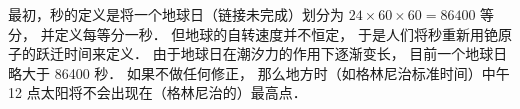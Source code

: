 
最初，秒的定义是将一个地球日（链接未完成）划分为 $24\times60\times60 = 86400$ 等分， 并定义每等分一秒． 但地球的自转速度并不恒定， 于是人们将秒重新用铯原子的跃迁时间来定义． 由于地球日在潮汐力的作用下逐渐变长， 目前一个地球日略大于 86400 秒． 如果不做任何修正， 那么地方时（如格林尼治标准时间）中午 12 点太阳将不会出现在（格林尼治的）最高点．
